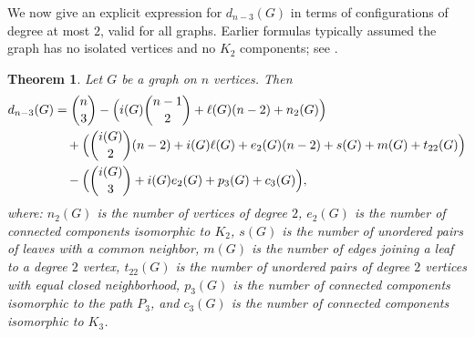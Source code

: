\documentclass[11pt]{amsart}
\newtheorem{theorem}{Theorem}
\numberwithin{equation}{section}
\begin{document}
We now give an explicit expression for $d_{n-3}(G)$ in terms of configurations of degree at most $2$, valid for all graphs. Earlier formulas typically assumed the graph has no isolated vertices and no $K_2$ components; see \cite{BeatonPaths2019}. 

\begin{theorem}\label{thm:dn-3}
Let $G$ be a graph on $n$ vertices. Then
\begin{align}
d_{n-3}(G) &= \binom{n}{3}
-\Bigl(i(G)\binom{n-1}{2}+\ell(G)(n-2)+n_2(G)\Bigr)\notag\\
&\quad+\Bigl(\binom{i(G)}{2}(n-2)+i(G)\ell(G)+e_2(G)(n-2)+s(G)+m(G)+t_{22}(G)\Bigr)\notag\\
&\quad-\Bigl(\binom{i(G)}{3}+i(G)e_2(G)+p_3(G)+c_3(G)\Bigr),\label{eq:dn-3-formula}
\end{align}
where:
$n_2(G)$ is the number of vertices of degree $2$,
$e_2(G)$ is the number of connected components isomorphic to $K_2$,
$s(G)$ is the number of unordered pairs of leaves with a common neighbor,
$m(G)$ is the number of edges joining a leaf to a degree $2$ vertex,
$t_{22}(G)$ is the number of unordered pairs of degree $2$ vertices with equal closed neighborhood,
$p_3(G)$ is the number of connected components isomorphic to the path $P_3$,
and $c_3(G)$ is the number of connected components isomorphic to $K_3$.
\end{theorem}
\end{document}
